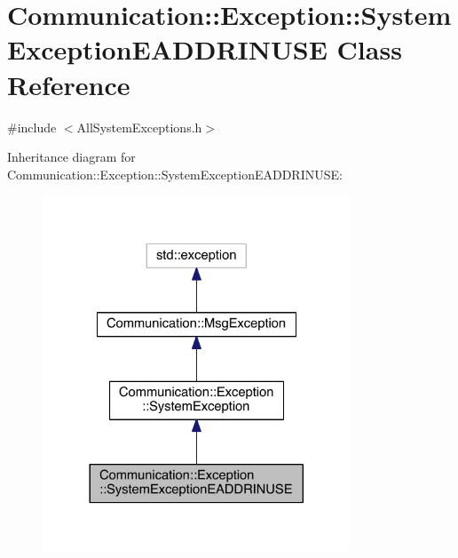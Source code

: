 \hypertarget{class_communication_1_1_exception_1_1_system_exception_e_a_d_d_r_i_n_u_s_e}{}\section{Communication\+:\+:Exception\+:\+:System\+Exception\+E\+A\+D\+D\+R\+I\+N\+U\+S\+E Class Reference}
\label{class_communication_1_1_exception_1_1_system_exception_e_a_d_d_r_i_n_u_s_e}


{\ttfamily \#include $<$All\+System\+Exceptions.\+h$>$}



Inheritance diagram for Communication\+:\+:Exception\+:\+:System\+Exception\+E\+A\+D\+D\+R\+I\+N\+U\+S\+E\+:\nopagebreak
\begin{figure}[H]
\begin{center}
\leavevmode
\includegraphics[width=260pt]{class_communication_1_1_exception_1_1_system_exception_e_a_d_d_r_i_n_u_s_e__inherit__graph}
\end{center}
\end{figure}


